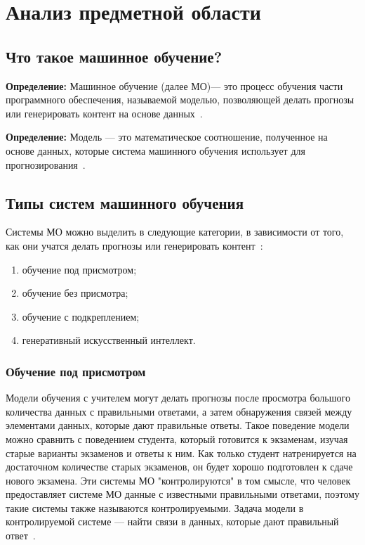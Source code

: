 \chapter{Анализ предметной области}

\section{Что такое машинное обучение?}

\textbf{ Определение:} Машинное обучение (далее МО)--- это процесс обучения части программного обеспечения, называемой моделью, позволяющей делать прогнозы или генерировать контент на основе данных~\cite{google}.

\textbf{Определение:} Модель --- это математическое соотношение, полученное на основе данных, которые система машинного обучения использует для прогнозирования~\cite{google}.

\section{Типы систем машинного обучения}

Системы МО можно выделить в следующие категории, в зависимости от того, как они учатся делать прогнозы или генерировать контент~\cite{google1}:
\begin{enumerate}[label=\arabic*), leftmargin=1.6\parindent]
    \item обучение под присмотром;
    \item обучение без присмотра;
    \item обучение с подкреплением;
    \item генеративный искусственный интеллект.
\end{enumerate}

\subsection{Обучение под присмотром}

Модели обучения с учителем могут делать прогнозы после просмотра большого количества данных с правильными ответами, а затем обнаружения связей между элементами данных, которые дают правильные ответы.
Такое поведение модели можно сравнить с поведением студента, который готовится к экзаменам, изучая старые варианты экзаменов и ответы к ним.
Как только студент натренируется на достаточном количестве старых экзаменов, он будет хорошо подготовлен к сдаче нового экзамена.
Эти системы МО "контролируются" в том смысле, что человек предоставляет системе МО данные с известными правильными ответами, поэтому такие системы также называются контролируемыми.
Задача модели в контролируемой системе --- найти связи в данных, которые дают правильный ответ~\cite{google1}.

